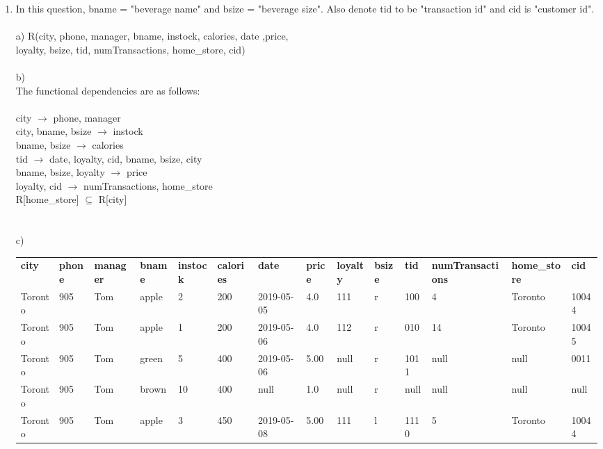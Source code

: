 \documentclass{article}
\begin{document}
\begin{enumerate}
    \item %
    In this question, bname = "beverage name" and bsize = "beverage size". Also denote tid to be "transaction id" and cid is "customer id".\\\\
	a)
	R(city, phone, manager, bname, instock, calories, date ,price,\\
	 loyalty, bsize, tid, numTransactions, home\_store, cid)\\\\
	b)\\The functional dependencies are as follows:\\\\
		city $\rightarrow$ phone, manager\\
		city, bname, bsize $\rightarrow$ instock\\
		bname, bsize $\rightarrow$ calories\\
		tid $\rightarrow$ date, loyalty, cid, bname, bsize, city\\
		bname, bsize, loyalty $\rightarrow$ price\\
		loyalty, cid $\rightarrow$ numTransactions, home\_store\\
		R[home\_store] $\subseteq$ R[city]
	\\\\\\
	c)\begin{table}[h]
		  \centering
		\begin{adjustbox}{width=1.1\textwidth}
		\begin{tabular}{llllllllllllll}
			\textbf{city}&\textbf{phone}&\textbf{manager}&\textbf{bname}&\textbf{instock}&\textbf{calories}&\textbf{date}&\textbf{price}&\textbf{loyalty}&\textbf{bsize}&\textbf{tid}&\textbf{numTransactions}&\textbf{home\_store}&\textbf{cid}\\
			Toronto & 905 & Tom & apple & 2 & 200 & 2019-05-05 & 4.0 & 111 & r  & 100 &4 & Toronto & 10044\\
			Toronto & 905 & Tom & apple & 1 & 200 & 2019-05-06 & 4.0 & 112 & r  & 010 &14 & Toronto & 10045 \\	
			Toronto & 905 & Tom & green & 5 & 400 & 2019-05-06 & 5.00 & null & r & 1011 & null & null & 0011 \\
			Toronto & 905 & Tom & brown & 10 & 400 & null       & 1.0  & null & r & null & null & null & null \\
			Toronto & 905 & Tom & apple & 3  & 450 & 2019-05-08 & 5.00 & 111  & l & 1110 & 5    & Toronto & 10044 \\

\end{tabular}
\end{adjustbox}
\end{table}
\end{enumerate}
\end{document}
